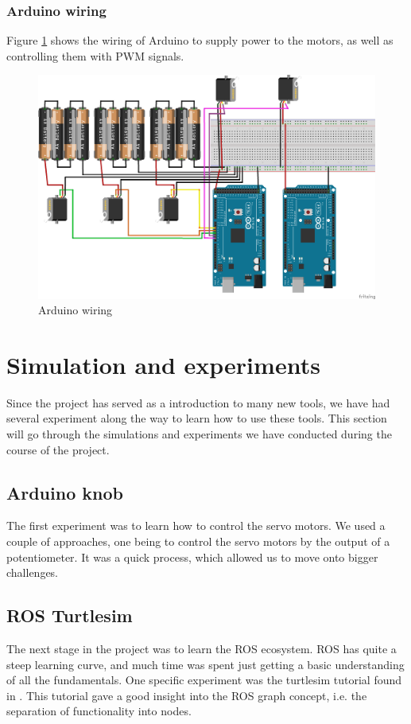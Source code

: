 \documentclass[11pt,a4paper, titlepage]{article}
\begin{document}
	\subsubsection{Arduino wiring}
	Figure \ref{fig:wiring} shows the wiring of Arduino to supply power to the motors, as well as controlling them with PWM signals.
	
	\begin{figure}[H]
		\centering
		\includegraphics[width=0.8\linewidth]{../Diagrams/Wiring.png}
		\caption{Arduino wiring}
		\label{fig:wiring}
	\end{figure}
	
		
	\section{Simulation and experiments}
	\label{simex}
	Since the project has served as a introduction to many new tools, we have had several experiment along the way to learn how to use these tools. This section will go through the simulations and experiments we have conducted during the course of the project.
	
	\subsection{Arduino knob}
	The first experiment was to learn how to control the servo motors. We used a couple of approaches, one being to control the servo motors by the output of a potentiometer. It was a quick process, which allowed us to move onto bigger challenges.
	
	\subsection{ROS Turtlesim}
	The next stage in the project was to learn the ROS ecosystem. ROS has quite a steep learning curve, and much time was spent just getting a basic understanding of all the fundamentals. One specific experiment was the turtlesim tutorial found in \cite{turtle2017}. This tutorial gave a good insight into the ROS graph concept, i.e. the separation of functionality into nodes.
	
\end{document}
